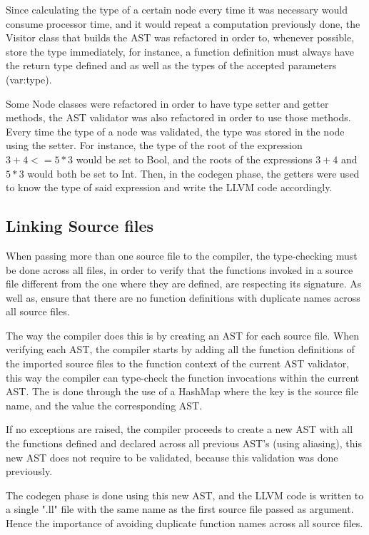 \documentclass[12pt]{article}
\begin{document}
Since calculating the type of a certain node every time it was necessary would consume processor time, and it would repeat a computation previously done, the Visitor class that builds the AST was refactored in order to, whenever possible, store the type immediately, for instance, a function definition must always have the return type defined and as well as the types of the accepted parameters (var:type).

Some Node classes were refactored in order to have type setter and getter methods, the AST validator was also refactored in order to use those methods. Every time the type of a node was validated, the type was stored in the node using the setter.
For instance, the type of the root of the expression $3+4 <= 5*3$ would be set to Bool, and the roots of the expressions $3+4$ and $5*3$ would both be set to Int. Then, in the codegen phase, the getters were used to know the type of said expression and write the LLVM code accordingly.


\subsection{Linking Source files}
When passing more than one source file to the compiler, the type-checking must be done across all files, in order to verify that the functions invoked in a source file different from the one where they are defined, are respecting its signature. As well as, ensure that there are no function definitions with duplicate names across all source files.

The way the compiler does this is by creating an AST for each source file. When verifying each AST, the compiler starts by adding all the function definitions of the imported source files to the function context of the current AST validator, this way the compiler can type-check the function invocations within the current AST. The is done through the use of a HashMap where the key is the source file name, and the value the corresponding AST.

If no exceptions are raised, the compiler proceeds to create a new AST with all the functions defined and declared across all previous AST's (using aliasing), this new AST does not require to be validated, because this validation was done previously.

The codegen phase is done using this new AST, and the LLVM code is written to a single ".ll" file with the same name as the first source file passed as argument. Hence the importance of avoiding duplicate function names across all source files.
\end{document}
